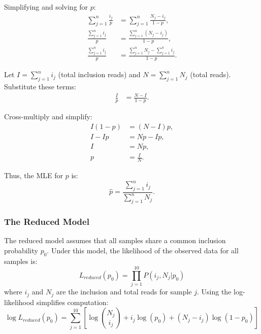 \documentclass{article}
\begin{document}
    Simplifying and solving for \( p \):
    \begin{align}
        \sum_{j=1}^{n} \frac{i_j}{p} &= \sum_{j=1}^{n} \frac{N_j - i_j}{1-p}, \\
        \frac{\sum_{j=1}^{n} i_j}{p} &= \frac{\sum_{j=1}^{n} (N_j - i_j)}{1-p}, \\
        \frac{\sum_{j=1}^{n} i_j}{p} &= \frac{\sum_{j=1}^{n} N_j - \sum_{j=1}^{n} i_j}{1-p}.
    \end{align}

    Let \( I = \sum_{j=1}^{n} i_j \) (total inclusion reads) and \( N = \sum_{j=1}^{n} N_j \) (total reads). Substitute these terms:
    \begin{align}
        \frac{I}{p} &= \frac{N - I}{1-p}.
    \end{align}

    Cross-multiply and simplify:
    \begin{align}
        I (1-p) &= (N - I) p, \\
        I - I p &= Np - I p, \\
        I &= Np, \\
        p &= \frac{I}{N}.
    \end{align}

    Thus, the MLE for \( p \) is:
    \begin{equation}
        \hat{p} = \frac{\sum_{j=1}^{n} i_j}{\sum_{j=1}^{n} N_j}.
        \label{eq:binomial-mle}
    \end{equation}

    \subsubsection{The Reduced Model}
    The reduced model assumes that all samples share a common inclusion probability \( p_0 \). Under this model, the likelihood of the observed data for all samples is:
    \begin{equation}
        L_{reduced}(p_0) = \prod_{j=1}^{10} P(i_j, N_j|p_0)
        \label{eq:reduced-likelihood}
    \end{equation}
    where \( i_j \) and \( N_j \) are the inclusion and total reads for sample \( j \). Using the log-likelihood simplifies computation:
    \begin{equation}
        \log L_{reduced}(p_0) = \sum_{j=1}^{10} \left[ \log \binom{N_j}{i_j} + i_j \log(p_0) + (N_j - i_j) \log(1-p_0) \right]
        \label{eq:log-reduced-likelihood}
    \end{equation}
\end{document}
